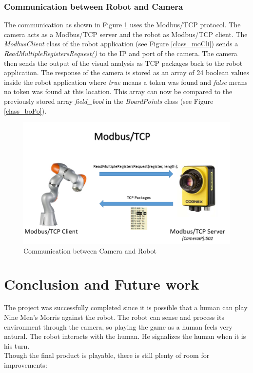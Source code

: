 \documentclass[a4paper]{spie}  %
\begin{document}
\begin{large}
\subsubsection{Communication between Robot and Camera}
\label{commu}
The communication as shown in Figure \ref{communication} uses the Modbus/TCP protocol. The camera acts as a Modbus/TCP server and the robot as Modbus/TCP client. The \emph{ModbusClient} class of the robot application (see Figure \ref{class_moCli})  sends a \emph{ReadMultipleRegistersRequest()} to the IP and port of the camera. The camera then sends the output of the visual analysis as TCP packages back to the robot application. The response of the camera is stored as an array of 24 boolean values inside the robot application where \emph{true} means a token was found and \emph{false} means no token was found at this location. This array can now be compared to the previously stored array \emph{field\_bool} in the \emph{BoardPoints} class (see Figure \ref{class_boPo}).
\begin{figure}[h]
\includegraphics[width=15cm]{images/communication.png}
\centering
\caption{Communication between Camera and Robot}
\label{communication}
\end{figure}

\clearpage
\section{Conclusion and Future work}
The project was successfully completed since it is possible that a human can play Nine Men's Morris against the robot. The robot can sense and process its environment through the camera, so playing the game as a human feels very natural. The robot interacts with the human. He signalizes the human when it is his turn. \\ 
Though the final product is playable, there is still plenty of room for improvements:

\end{large}
\end{document}
